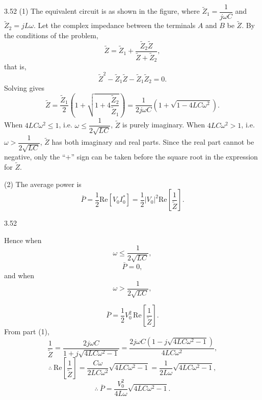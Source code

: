 \begin{solution}{3.52}
(1) The equivalent circuit is as shown in the figure, where $\tilde{Z}_1=\dfrac{1}{j\omega C}$ and $\tilde{Z}_2=jL\omega$. Let the complex impedance between the terminals $A$ and $B$ be $\tilde{Z}$. By the conditions of the problem,
\[
\tilde{Z}=\tilde{Z}_1+\frac{\tilde{Z}_2\tilde{Z}}{\tilde{Z}+\tilde{Z}_2},
\]
that is,
\[
\tilde{Z}^2-\tilde{Z}_1\tilde{Z}-\tilde{Z}_1\tilde{Z}_2=0.
\]
Solving gives
\[
\tilde{Z}=\frac{\tilde{Z}_1}{2}\left(1+\sqrt{1+4\frac{\tilde{Z}_2}{\tilde{Z}_1}}\right)
=\frac{1}{2j\omega C}\left(1+\sqrt{1-4LC\omega^2}\right).
\]
When $4LC\omega^2\le1$, i.e. $\omega\le\dfrac{1}{2\sqrt{LC}}$, $\tilde{Z}$ is purely imaginary. When $4LC\omega^2>1$, i.e. $\omega>\dfrac{1}{2\sqrt{LC}}$, $\tilde{Z}$ has both imaginary and real parts. Since the real part cannot be negative, only the ``$+$'' sign can be taken before the square root in the expression for $\tilde{Z}$.

(2) The average power is
\[
\bar{P}=\frac{1}{2}\mathrm{Re}\left[V_0I_0^*\right]
=\frac{1}{2}|V_0|^2\mathrm{Re}\left[\frac{1}{\tilde{Z}}\right].
\]
\begin{figbox}{3.52}
\end{figbox}

Hence when
\[
\omega\le\frac{1}{2\sqrt{LC}},
\]
\[
\bar{P}=0,
\]
and when
\[
\omega>\frac{1}{2\sqrt{LC}},
\]

\[
\bar{P}=\frac{1}{2}V_0^2\,\mathrm{Re}\left[\frac{1}{\tilde{Z}}\right].
\]
From part (1),
\[
\frac{1}{\tilde{Z}}
=\frac{2j\omega C}{1+j\sqrt{4LC\omega^2-1}}
=\frac{2j\omega C\left(1-j\sqrt{4LC\omega^2-1}\right)}{4LC\omega^2},
\]
\[
\therefore\ \mathrm{Re}\left[\frac{1}{\tilde{Z}}\right]
=\frac{C\omega}{2LC\omega^2}\sqrt{4LC\omega^2-1}
=\frac{1}{2L\omega}\sqrt{4LC\omega^2-1},
\]
\[
\therefore\ \bar{P}=\frac{V_0^2}{4L\omega}\sqrt{4LC\omega^2-1}.
\]
\end{solution}

